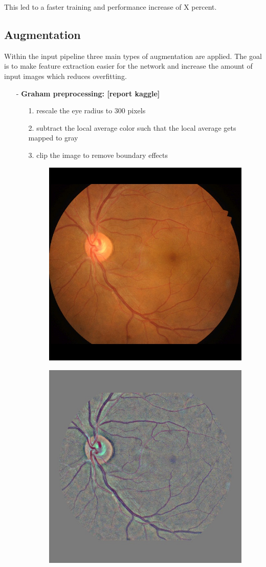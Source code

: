 \documentclass{article}
\begin{document}
This led to a faster training and performance increase of X percent.

\subsection{Augmentation}
Within the input pipeline three main types of augmentation are applied.
The goal is to make feature extraction easier for the network and increase the amount of input images which reduces overfitting.
\begin{itemize}
  \item[-] \textbf{Graham preprocessing:  [report kaggle]} \begin{itemize}
    \item[1.] rescale the eye radius to 300 pixels 
    \item[2.] subtract the local average color such that the local average gets mapped to gray
    \item[3.] clip the image to remove boundary effects
    \begin{figure}[h]
      \begin{minipage}[b]{.5\textwidth}
          \begin{center}
          \includegraphics[width=.5\linewidth]{IDRiD_060.jpg}
          \captionsetup{justification=centering}
          \label{fig:IDRiD}
          \end{center}
      \end{minipage}%
      \begin{minipage}[b]{.5\textwidth}
          \begin{center}
          \includegraphics[width=.5\linewidth]{IDRiD_060_graham.jpg}

\end{center}
\end{minipage}
\end{figure}
\end{itemize}
\end{itemize}
\end{document}

